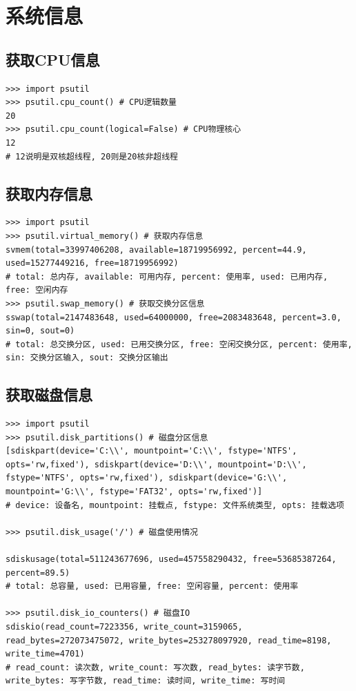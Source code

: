 \chapter{系统信息}
\section{获取CPU信息}
\begin{lstlisting}[style=demostyle,numbers=none]
>>> import psutil
>>> psutil.cpu_count() # CPU逻辑数量
20
>>> psutil.cpu_count(logical=False) # CPU物理核心
12
# 12说明是双核超线程, 20则是20核非超线程
\end{lstlisting}

\section{获取内存信息}
\begin{lstlisting}[style=demostyle,numbers=none]
>>> import psutil
>>> psutil.virtual_memory() # 获取内存信息
svmem(total=33997406208, available=18719956992, percent=44.9, used=15277449216, free=18719956992)
# total: 总内存, available: 可用内存, percent: 使用率, used: 已用内存, free: 空闲内存
>>> psutil.swap_memory() # 获取交换分区信息
sswap(total=2147483648, used=64000000, free=2083483648, percent=3.0, sin=0, sout=0)
# total: 总交换分区, used: 已用交换分区, free: 空闲交换分区, percent: 使用率, sin: 交换分区输入, sout: 交换分区输出
\end{lstlisting}

\section{获取磁盘信息}
\begin{lstlisting}[style=demostyle,numbers=none]
>>> import psutil
>>> psutil.disk_partitions() # 磁盘分区信息
[sdiskpart(device='C:\\', mountpoint='C:\\', fstype='NTFS', opts='rw,fixed'), sdiskpart(device='D:\\', mountpoint='D:\\', fstype='NTFS', opts='rw,fixed'), sdiskpart(device='G:\\', mountpoint='G:\\', fstype='FAT32', opts='rw,fixed')]
# device: 设备名, mountpoint: 挂载点, fstype: 文件系统类型, opts: 挂载选项

>>> psutil.disk_usage('/') # 磁盘使用情况

sdiskusage(total=511243677696, used=457558290432, free=53685387264, percent=89.5)
# total: 总容量, used: 已用容量, free: 空闲容量, percent: 使用率

>>> psutil.disk_io_counters() # 磁盘IO
sdiskio(read_count=7223356, write_count=3159065, read_bytes=272073475072, write_bytes=253278097920, read_time=8198, write_time=4701)
# read_count: 读次数, write_count: 写次数, read_bytes: 读字节数, write_bytes: 写字节数, read_time: 读时间, write_time: 写时间
\end{lstlisting}

